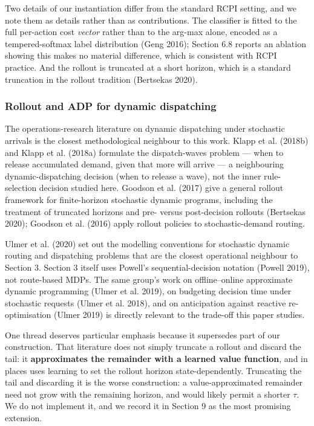 \documentclass[review,3p,times]{elsarticle}
\theoremstyle{definition}
\begin{document}
Two details of our instantiation differ from the standard RCPI setting,
and we note them as details rather than as contributions. The classifier
is fitted to the full per-action cost \emph{vector} rather than to the
arg-max alone, encoded as a tempered-softmax label distribution (Geng
2016); Section 6.8 reports an ablation showing this makes no material
difference, which is consistent with RCPI practice. And the rollout is
truncated at a short horizon, which is a standard truncation in the
rollout tradition (Bertsekas 2020).

\subsubsection{Rollout and ADP for dynamic
dispatching}\label{rollout-and-adp-for-dynamic-dispatching}

The operations-research literature on dynamic dispatching under
stochastic arrivals is the closest methodological neighbour to this
work. Klapp et al. (2018b) and Klapp et al. (2018a) formulate the
dispatch-waves problem --- when to release accumulated demand, given
that more will arrive --- a neighbouring dynamic-dispatching decision
(when to release a wave), not the inner rule-selection decision studied
here. Goodson et al. (2017) give a general rollout framework for
finite-horizon stochastic dynamic programs, including the treatment of
truncated horizons and pre- versus post-decision rollouts (Bertsekas
2020); Goodson et al. (2016) apply rollout policies to stochastic-demand
routing.

Ulmer et al. (2020) set out the modelling conventions for stochastic
dynamic routing and dispatching problems that are the closest
operational neighbour to Section 3. Section 3 itself uses Powell's
sequential-decision notation (Powell 2019), not route-based MDPs. The
same group's work on offline--online approximate dynamic programming
(Ulmer et al. 2019), on budgeting decision time under stochastic
requests (Ulmer et al. 2018), and on anticipation against reactive
re-optimisation (Ulmer 2019) is directly relevant to the trade-off this
paper studies.

One thread deserves particular emphasis because it supersedes part of
our construction. That literature does not simply truncate a rollout and
discard the tail: it \textbf{approximates the remainder with a learned
value function}, and in places uses learning to set the rollout horizon
state-dependently. Truncating the tail and discarding it is the worse
construction: a value-approximated remainder need not grow with the
remaining horizon, and would likely permit a shorter \(\tau\). We do not
implement it, and we record it in Section 9 as the most promising
extension.
\end{document}

